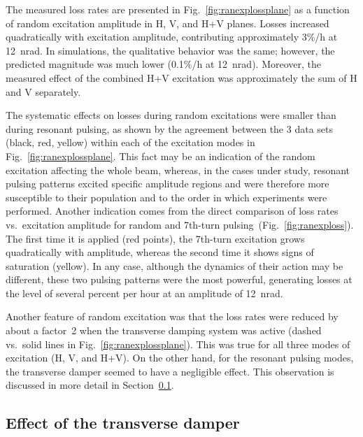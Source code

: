\documentclass[
prstab
,reprint
,linenumbers
,longbibliography
,preprintnumbers
,showkeys
,amsfonts,amssymb,amsmath
,floatfix
]{revtex4-1}
\newcommand{\seventhtp}{7th-turn pulsing}
\begin{document}
The measured loss rates are presented in
Fig.~\ref{fig:ranexplossplane} as a function of random excitation
amplitude in H, V, and H+V planes.  Losses increased quadratically
with excitation amplitude, contributing approximately 3\%/h at
12~nrad. In simulations, the qualitative behavior was the same;
however, the predicted magnitude was much lower (0.1\%/h at
12~nrad). Moreover, the measured effect of the combined H+V excitation
was approximately the sum of H and V separately.

The systematic effects on losses during random excitations were
smaller than during resonant pulsing, as shown by the agreement
between the 3 data sets (black, red, yellow) within each of the
excitation modes in Fig.~\ref{fig:ranexplossplane}. This fact may be
an indication of the random excitation affecting the whole beam,
whereas, in the cases under study, resonant pulsing patterns excited
specific amplitude regions and were therefore more susceptible to
their population and to the order in which experiments were
performed. Another indication comes from the direct comparison of loss
rates vs.\ excitation amplitude for random and \seventhtp\
(Fig.~\ref{fig:ranexploss}). The first time it is applied (red
points), the 7th-turn excitation grows quadratically with amplitude,
whereas the second time it shows signs of saturation (yellow). In any
case, although the dynamics of their action may be different, these
two pulsing patterns were the most powerful, generating losses at the
level of several percent per hour at an amplitude of 12~nrad.

Another feature of random excitation was that the loss rates were
reduced by about a factor~2 when the transverse damping system was
active (dashed vs.\ solid lines in
Fig.~\ref{fig:ranexplossplane}). This was true for all three modes of
excitation (H, V, and H+V). On the other hand, for the resonant
pulsing modes, the transverse damper seemed to have a negligible
effect. This observation is discussed in more detail in
Section~\ref{sec:damp}.



\subsection{Effect of the transverse damper}
\label{sec:damp}
\end{document}
